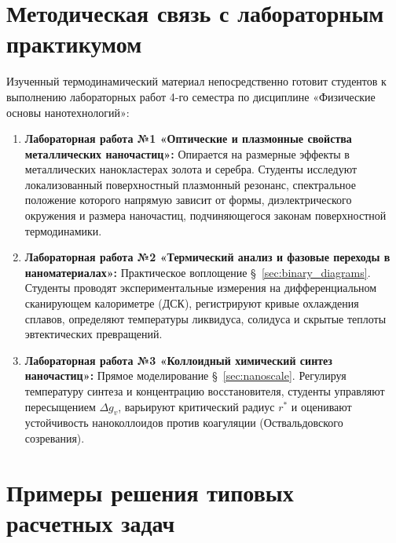 \documentclass[12pt,a4paper]{article}
\begin{document}
\section{Методическая связь с лабораторным практикумом}
\label{sec:lab_connection}

Изученный термодинамический материал непосредственно готовит студентов к выполнению лабораторных работ 4-го семестра по дисциплине «Физические основы нанотехнологий»:

\begin{enumerate}
    \item \textbf{Лабораторная работа №1 «Оптические и плазмонные свойства металлических наночастиц»:}
    Опирается на размерные эффекты в металлических нанокластерах золота и серебра. Студенты исследуют локализованный поверхностный плазмонный резонанс, спектральное положение которого напрямую зависит от формы, диэлектрического окружения и размера наночастиц, подчиняющегося законам поверхностной термодинамики.
    \item \textbf{Лабораторная работа №2 «Термический анализ и фазовые переходы в наноматериалах»:}
    Практическое воплощение §~\ref{sec:binary_diagrams}. Студенты проводят экспериментальные измерения на дифференциальном сканирующем калориметре (ДСК), регистрируют кривые охлаждения сплавов, определяют температуры ликвидуса, солидуса и скрытые теплоты эвтектических превращений.
    \item \textbf{Лабораторная работа №3 «Коллоидный химический синтез наночастиц»:}
    Прямое моделирование §~\ref{sec:nanoscale}. Регулируя температуру синтеза и концентрацию восстановителя, студенты управляют пересыщением $\Delta g_v$, варьируют критический радиус $r^*$ и оценивают устойчивость наноколлоидов против коагуляции (Оствальдовского созревания).
\end{enumerate}

\section{Примеры решения типовых расчетных задач}
\label{sec:examples}
\end{document}
